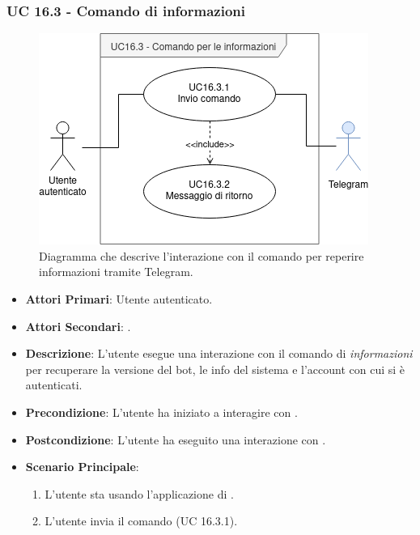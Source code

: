 	\subsubsection{UC 16.3 - Comando di informazioni}

	\begin{figure}[H]
		\centering
		\includegraphics[scale=0.60]{res/images/uc16.3}
		\caption{Diagramma che descrive l'interazione con il comando per reperire informazioni tramite Telegram.}
	\end{figure}

	\begin{itemize}
		\item \textbf{Attori Primari}: Utente autenticato.
		\item \textbf{Attori Secondari}: .
		\item \textbf{Descrizione}: L'utente esegue una interazione con il comando di \textit{informazioni} per recuperare la versione del bot, le info del sistema e l'account con cui si è autenticati.
		\item \textbf{Precondizione}: L'utente ha iniziato a interagire con .
		\item \textbf{Postcondizione}: L'utente ha eseguito una interazione con .
		\item \textbf{Scenario Principale}:
		\begin{enumerate}
			\item L'utente sta usando l'applicazione di . 
			\item L'utente invia il comando (UC 16.3.1).
		\end{enumerate}
	\end{itemize}

